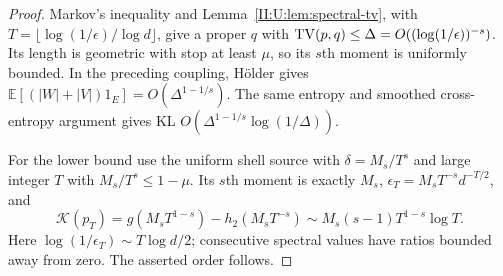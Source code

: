 \begin{proof}
Markov's inequality and Lemma~\ref{II:U:lem:spectral-tv}, with
$T=\lfloor\log(1/\epsilon)/\log d\rfloor$, give a proper $q$ with
$\operatorname{TV}(p,q)\le\Delta=O((\log(1/\epsilon))^{-s})$.
Its length is geometric with stop at least $\mu$, so its $s$th moment
is uniformly bounded. In the preceding coupling, H\"older gives
$\mathbb E[(|W|+|V|)1_E]=O(\Delta^{1-1/s})$.
The same entropy and smoothed cross-entropy argument gives KL
$O(\Delta^{1-1/s}\log(1/\Delta))$.

For the lower bound use the uniform shell source with $\delta=M_s/T^s$
and large integer $T$ with $M_s/T^s\le1-\mu$. Its $s$th moment is exactly $M_s$,
$\epsilon_T=M_sT^{-s}d^{-T/2}$, and
\[
 \mathcal K(p_T)=g(M_sT^{1-s})-h_2(M_sT^{-s})
 \sim M_s(s-1)T^{1-s}\log T.
\]
Here $\log(1/\epsilon_T)\sim T\log d/2$; consecutive spectral values
have ratios bounded away from zero. The asserted order follows.
\end{proof}
